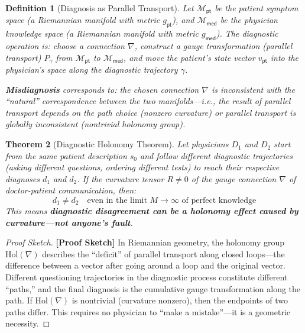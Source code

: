 \documentclass[12pt,a4paper]{article}
\newtheorem{theorem}{Theorem}[section]
\newtheorem{definition}[theorem]{Definition}
\theoremstyle{remark}
\newcommand{\med}{\textsf{med}}
\newcommand{\pt}{\textsf{pt}}
\newcommand{\rigorSketch}{\textnormal{\textbf{[Proof Sketch]}}}
\begin{document}
\begin{definition}[Diagnosis as Parallel Transport]\label{def:parallel_transport}
Let $\mathcal{M}_{\pt}$ be the patient symptom space (a Riemannian manifold with metric $g_{\pt}$), and $\mathcal{M}_{\med}$ be the physician knowledge space (a Riemannian manifold with metric $g_{\med}$). The diagnostic operation is: choose a connection $\nabla$, construct a gauge transformation (parallel transport) $P_{\gamma}$ from $\mathcal{M}_{\pt}$ to $\mathcal{M}_{\med}$, and move the patient's state vector $v_{\pt}$ into the physician's space along the diagnostic trajectory $\gamma$.

\textbf{Misdiagnosis} corresponds to: the chosen connection $\nabla$ is inconsistent with the ``natural'' correspondence between the two manifolds---i.e., the result of parallel transport depends on the path choice (nonzero curvature) or parallel transport is globally inconsistent (nontrivial holonomy group).
\end{definition}

\begin{theorem}[Diagnostic Holonomy Theorem]\label{thm:holonomy}
Let physicians $D_1$ and $D_2$ start from the same patient description $s_0$ and follow different diagnostic trajectories (asking different questions, ordering different tests) to reach their respective diagnoses $d_1$ and $d_2$. If the curvature tensor $R \neq 0$ of the gauge connection $\nabla$ of doctor-patient communication, then:
\begin{equation}
    d_1 \neq d_2 \quad \text{even in the limit } M \to \infty \text{ of perfect knowledge}
\end{equation}
This means \textbf{diagnostic disagreement can be a holonomy effect caused by curvature---not anyone's fault}.
\end{theorem}

\begin{proof}[Proof Sketch]\rigorSketch
In Riemannian geometry, the holonomy group $\text{Hol}(\nabla)$ describes the ``deficit'' of parallel transport along closed loops---the difference between a vector after going around a loop and the original vector. Different questioning trajectories in the diagnostic process constitute different ``paths,'' and the final diagnosis is the cumulative gauge transformation along the path. If $\text{Hol}(\nabla)$ is nontrivial (curvature nonzero), then the endpoints of two paths differ. This requires no physician to ``make a mistake''---it is a geometric necessity.
\end{proof}
\end{document}

